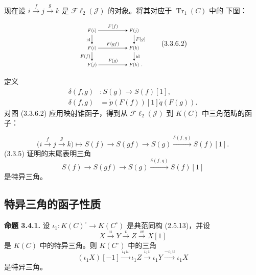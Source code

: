 \clearpage
{}%
\begingroup
\small
\setlength{\abovedisplayskip}{3pt plus 2pt minus 2pt}%
\setlength{\belowdisplayskip}{3pt plus 2pt minus 2pt}%
\setlength{\jot}{2pt}%
现在设 $i\xrightarrow{f}j\xrightarrow{g}k$ 是
$\mathcal{F}\ell_2(\mathcal{J})$ 的对象。将其对应于 $\operatorname{Tr}_1(C)$ 中的
下图：

\begin{equation}
\begin{tikzpicture}[>=stealth,baseline=(current bounding box.center),scale=0.66,
  every node/.style={transform shape}]
  \node (Fi1) at (0,2.55) {$F(i)$};
  \node (Fj1) at (3.15,2.55) {$F(j)$};
  \node (Fi2) at (0,1.25) {$F(i)$};
  \node (Fk1) at (3.15,1.25) {$F(k)$};
  \node (Fj2) at (0,0) {$F(j)$};
  \node (Fk2) at (3.15,0) {$F(k)$};
  \draw[->] (Fi1) -- node[above] {$F(f)$} (Fj1);
  \draw[->] (Fi2) -- node[above] {$F(gf)$} (Fk1);
  \draw[->] (Fj2) -- node[above] {$F(g)$} (Fk2);
  \draw[->] (Fi1) -- node[left] {$\mathrm{id}$} (Fi2);
  \draw[->] (Fj1) -- node[right] {$F(g)$} (Fk1);
  \draw[->] (Fi2) -- node[left] {$F(f)$} (Fj2);
  \draw[->] (Fk1) -- node[right] {$\mathrm{id}$} (Fk2);
  \node[anchor=base west,inner sep=0pt,xshift=.08em] at (Fk2.base east) {$.$};
\end{tikzpicture}
\tag{3.3.6.2}
\end{equation}

定义
\begin{equation}
\begin{aligned}
  \delta(f,g)&\colon S(g)\longrightarrow S(f)[1],\\
  \delta(f,g)&=\dot p(F(f))[1]\dot q(F(g)).
\end{aligned}
\tag{3.3.6.3}
\end{equation}
对图 (3.3.6.2) 应用映射锥函子，得到从
$\mathcal{F}\ell_2(\mathcal{J})$ 到 $K(C)$ 中三角范畴的函子：

\begin{equation}
  \bigl(i\xrightarrow{f}j\xrightarrow{g}k\bigr)
  \longmapsto
  S(f)\longrightarrow S(gf)\longrightarrow S(g)
  \xrightarrow{\delta(f,g)}S(f)[1].
  \tag{3.3.6.4}
\end{equation}
(3.3.5) 证明的末尾表明三角
\[
  S(f)\longrightarrow S(gf)\longrightarrow S(g)
  \xrightarrow{\delta(f,g)}S(f)[1]
\]
是特异三角。

\subsection{特异三角的函子性质}

\noindent\textbf{命题 3.4.1.}\quad
设 $\iota_1\colon K(C)^{\circ}\longrightarrow K(C^{\circ})$ 是典范同构
(2.5.13)，并设
\[
  X\xrightarrow{u}Y\xrightarrow{v}Z\xrightarrow{w}X[1]
\]
是 $K(C)$ 中的特异三角。则 $K(C^{\circ})$ 中的三角
\[
  (\iota_1X)[-1]\xrightarrow{\iota_1w}\iota_1Z
  \xrightarrow{\iota_1v}\iota_1Y
  \xrightarrow{-\iota_1u}\iota_1X
\]
是特异三角。
\endgroup
